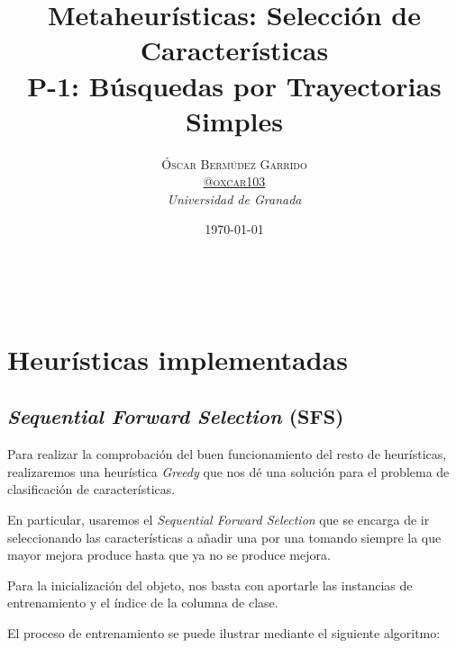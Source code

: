 \documentclass[a4paper, 11pt]{article}
\title{\textbf{Metaheurísticas: Selección de Características}\\ %
P-1: Búsquedas por Trayectorias Simples} %
\author{\textsc{Óscar Bermúdez Garrido\\
\href{http://www.github.com/oxcar103}{@oxcar103}} %
\\{\textit{Universidad de Granada}}} %
\date{\today} %
\makeatletter
\renewcommand{\maketitle}{
  \begin{flushright} %
  {\LARGE\@title} %
  
  \vspace{50pt} %
  
  {\large\@author} %
  \\\@date %
  \vspace{40pt} %
  \end{flushright}
}
\makeatother
\begin{document}
\maketitle %

\renewcommand{\abstractname}{Resumen} %



{\parskip=2pt
  \tableofcontents
}
\pagebreak

	
	
	
	\section{Heurísticas implementadas}
		\subsection{\textit{Sequential Forward Selection} (\textbf{SFS})}
			Para realizar la comprobación del buen funcionamiento del resto de heurísticas, realizaremos
			una heurística \textit{Greedy} que nos dé una solución para el problema de clasificación
			de características.
			
			En particular, usaremos el \textit{Sequential Forward Selection} que se encarga de ir
			seleccionando las características a añadir una por una tomando siempre la que mayor mejora
			produce hasta que ya no se produce mejora.
			
			Para la inicialización del objeto, nos basta con aportarle las instancias de entrenamiento
			y el índice de la columna de clase.
			
			El proceso de entrenamiento se puede ilustrar mediante el siguiente algoritmo:
\end{document}
